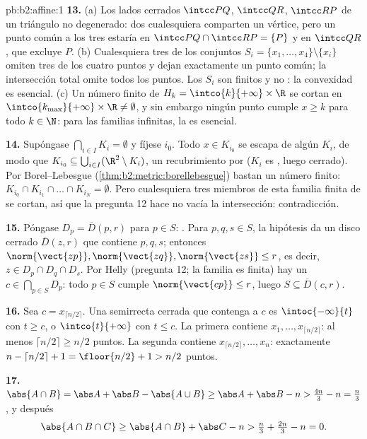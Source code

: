 \begin{solution}{pb:b2:affine:1}
\textbf{13.} (a) Los lados cerrados $\intcc PQ$, $\intcc QR$, $\intcc
RP$ de un triángulo no degenerado: dos cualesquiera comparten un
vértice, pero un punto común a los tres estaría en $\intcc PQ \cap
\intcc RP = \{P\}$ y en $\intcc QR$, que excluye $P$. (b)
Cualesquiera tres de los conjuntos $S_i = \{x_1, \dots, x_4\}
\setminus \{x_i\}$ omiten tres de los cuatro puntos y dejan
exactamente un punto común; la intersección total omite todos los
puntos. Los $S_i$ son finitos y no : la convexidad es
esencial. (c) Un número finito de $H_k = \intco{k}{+\infty} \times
\R$ se cortan en $\intco{k_{\max}}{+\infty} \times \R \neq
\emptyset$, y sin embargo ningún punto cumple $x \geq k$ para todo $k
\in \N$: para las familias infinitas, la  es esencial.

\textbf{14.} Supóngase $\bigcap_{i \in I}K_i = \emptyset$ y fíjese
$i_0$. Todo $x \in K_{i_0}$ se escapa de algún $K_i$, de modo que
$K_{i_0} \subseteq \bigcup_{i \in I}(\R^2 \setminus K_i)$, un
recubrimiento por  ($K_i$ es , luego cerrado). Por
Borel--Lebesgue (\cref{thm:b2:metric:borellebesgue}) bastan un número
finito: $K_{i_0} \cap K_{i_1} \cap \dots \cap K_{i_N} = \emptyset$.
Pero cualesquiera tres miembros de esta familia finita de
 se cortan, así que la pregunta 12 hace no vacía la
intersección: contradicción.

\textbf{15.} Póngase $D_p = \overline D(p, r)$ para $p \in S$:
 . Para $p, q, s \in S$, la hipótesis da
un disco cerrado $\overline D(z, r)$ que contiene $p, q, s$; entonces
$\norm{\vect{zp}}, \norm{\vect{zq}}, \norm{\vect{zs}} \leq r$, es
decir, $z \in D_p \cap D_q \cap D_s$. Por Helly (pregunta 12; la
familia es finita) hay un $c \in \bigcap_{p \in S}D_p$: todo $p \in
S$ cumple $\norm{\vect{cp}} \leq r$, luego $S \subseteq \overline
D(c, r)$.

\textbf{16.} Sea $c = x_{\lceil n/2\rceil}$. Una semirrecta cerrada
que contenga a $c$ es $\intoc{-\infty}{t}$ con $t \geq c$, o
$\intco{t}{+\infty}$ con $t \leq c$. La primera contiene $x_1, \dots,
x_{\lceil n/2\rceil}$: al menos $\lceil n/2\rceil \geq n/2$ puntos.
La segunda contiene $x_{\lceil n/2\rceil}, \dots, x_n$: exactamente
$n - \lceil n/2\rceil + 1 = \floor{n/2} + 1 > n/2$ puntos.

\textbf{17.} $\abs{A \cap B} = \abs A + \abs B - \abs{A \cup B} \geq
\abs A + \abs B - n > \tfrac{4n}3 - n = \tfrac n3$, y después
\[
\abs{A \cap B \cap C} \geq \abs{A \cap B} + \abs C - n >
\tfrac n3 + \tfrac{2n}3 - n = 0 .
\]


\end{solution}
